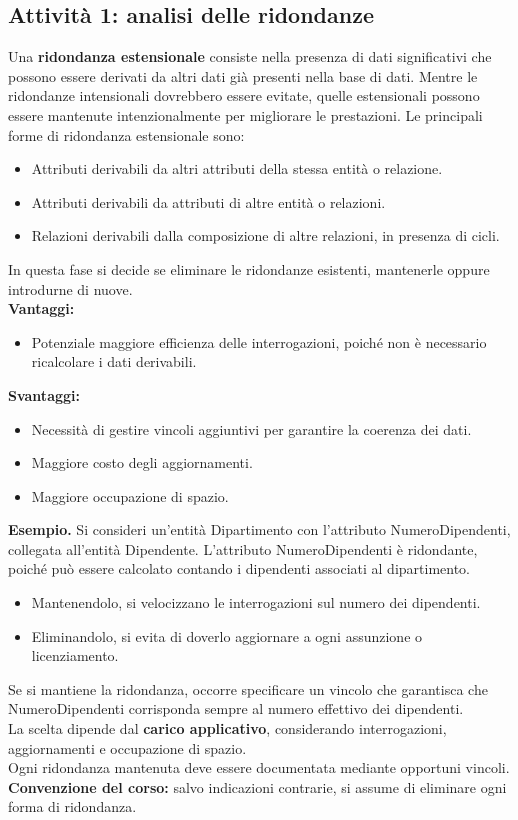 \subsection{Attività 1: analisi delle ridondanze}
Una \textbf{ridondanza estensionale} consiste nella
presenza di dati significativi che possono essere
derivati da altri dati già presenti nella base di dati.
Mentre le ridondanze intensionali dovrebbero essere
evitate, quelle estensionali possono essere mantenute
intenzionalmente per migliorare le prestazioni.
Le principali forme di ridondanza estensionale sono:
\begin{itemize}
    \item Attributi derivabili da altri attributi
    della stessa entità o relazione.
    \item Attributi derivabili da attributi di altre
    entità o relazioni.
    \item Relazioni derivabili dalla composizione
    di altre relazioni, in presenza di cicli.
\end{itemize}
\noindent
In questa fase si decide se eliminare le ridondanze
esistenti, mantenerle oppure introdurne di nuove.\\
\textbf{Vantaggi:}
\begin{itemize}
    \item Potenziale maggiore efficienza delle interrogazioni,
    poiché non è necessario ricalcolare i dati derivabili.
\end{itemize}
\noindent
\textbf{Svantaggi:}
\begin{itemize}
    \item Necessità di gestire vincoli aggiuntivi
    per garantire la coerenza dei dati.
    \item Maggiore costo degli aggiornamenti.
    \item Maggiore occupazione di spazio.
\end{itemize}
\medskip
\noindent
\textcolor{verdeEsempio}{\textbf{Esempio. }}
Si consideri un'entità Dipartimento con l'attributo
NumeroDipendenti, collegata all'entità Dipendente.
L'attributo NumeroDipendenti è ridondante, poiché
può essere calcolato contando i dipendenti associati
al dipartimento.
\begin{itemize}
    \item Mantenendolo, si velocizzano le interrogazioni
    sul numero dei dipendenti.
    \item Eliminandolo, si evita di doverlo aggiornare
    a ogni assunzione o licenziamento.
\end{itemize}
\noindent
Se si mantiene la ridondanza, occorre specificare
un vincolo che garantisca che NumeroDipendenti
corrisponda sempre al numero effettivo dei dipendenti.\medskip\\
\noindent
La scelta dipende dal \textbf{carico applicativo},
considerando interrogazioni, aggiornamenti e
occupazione di spazio.\\
Ogni ridondanza mantenuta deve essere documentata
mediante opportuni vincoli.\\
\textbf{Convenzione del corso:} salvo indicazioni
contrarie, si assume di eliminare ogni forma
di ridondanza.

